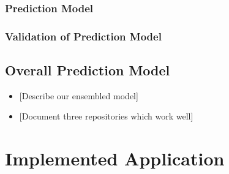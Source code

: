 \documentclass[%
a4paper,
DIV12,
2.5headlines,
bigheadings,
titlepage,
openbib,
]{scrartcl}
\begin{document}
\subsubsection{Prediction Model}\label{prediction-model-2}


\subsubsection{Validation of Prediction
Model}\label{validation-of-prediction-model-2}


\subsection{Overall Prediction
Model}\label{overall-prediction-model}

\begin{itemize}
\tightlist
\item
  {[}Describe our ensembled model{]}
\item
  {[}Document three repositories which work well{]}
\end{itemize}

\section{Implemented Application}\label{implemented-application}
\end{document}
